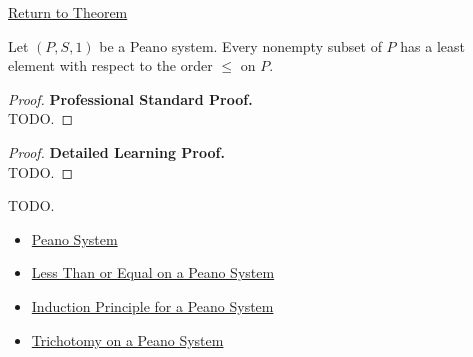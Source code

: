 \newpage
{}
\label{prf:well-ordering-principle}

\begin{remark*}[Return]
\hyperref[thm:well-ordering-principle]{Return to Theorem}
\end{remark*}

\begin{theorem*}
Let $(P,S,1)$ be a Peano system. Every nonempty subset of $P$ has a least
element with respect to the order $\le$ on $P$.
\end{theorem*}

\begin{proof}
\textbf{Professional Standard Proof.}~\\
TODO.
\end{proof}

\begin{proof}
\textbf{Detailed Learning Proof.}~\\
TODO.
\end{proof}

\begin{remark*}
TODO.
\end{remark*}

\begin{dependencies}
\begin{itemize}
  \item \hyperref[def:peano-system]{Peano System}
  \item \hyperref[def:less-than-or-equal-on-peano-system]{Less Than or Equal on a Peano System}
  \item \hyperref[thm:induction-principle-for-peano-system]{Induction Principle for a Peano System}
  \item \hyperref[thm:trichotomy-on-peano-system]{Trichotomy on a Peano System}
\end{itemize}
\end{dependencies}

